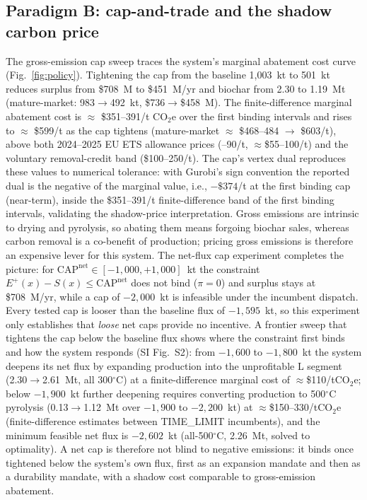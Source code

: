 \subsection{Paradigm B: cap-and-trade and the shadow carbon price}

The gross-emission cap sweep traces the system's marginal abatement cost curve
(Fig.~\ref{fig:policy}). Tightening the cap from the baseline 1{,}003~kt to
501~kt reduces surplus from \$708~M to \$451~M/yr and biochar from 2.30 to
1.19~Mt (mature-market: 983$\rightarrow$492~kt, \$736$\rightarrow$\$458~M).
The finite-difference marginal abatement cost is
$\approx$ \$351--391/t CO$_2$e over the first binding intervals and rises to
$\approx$ \$599/t as the cap tightens (mature-market $\approx$ \$468--484
$\rightarrow$ \$603/t), above both 2024--2025 EU ETS allowance prices
(--90/t, $\approx$\$55--100/t) and the voluntary removal-credit
band (\$100--250/t).
The cap's vertex dual reproduces these values to numerical tolerance: with
Gurobi's sign
convention the reported dual is the negative of the marginal value, i.e.,
$-\$374$/t at the first binding cap (near-term), inside the
\$351--391/t finite-difference band of the first binding intervals, validating the
shadow-price interpretation. Gross emissions are
intrinsic to drying and pyrolysis, so abating them means forgoing biochar
sales, whereas carbon removal is a co-benefit of production; pricing
gross emissions is therefore an expensive lever for this system. The net-flux cap
experiment completes the picture: for $\mathrm{CAP}^{\mathrm{net}}\in[-1{,}000, +1{,}000]$~kt the
constraint $E^{+}(x)-S(x)\le\mathrm{CAP}^{\mathrm{net}}$
does not bind ($\pi=0$) and surplus stays at \$708~M/yr, while a cap of
$-2{,}000$~kt is infeasible under the incumbent dispatch. Every tested cap is
looser than the baseline flux of $-1{,}595$~kt, so this experiment only
establishes that \emph{loose} net caps provide no incentive. A frontier sweep
that tightens the cap below the baseline flux shows where the constraint first
binds and how the system responds (SI Fig.~S2): from $-1{,}600$ to
$-1{,}800$~kt the system deepens its net flux by expanding production into the
unprofitable L segment (2.30$\rightarrow$2.61~Mt, all 300$^\circ$C) at a
finite-difference marginal cost of $\approx$\$110/tCO$_2$e; below
$-1{,}900$~kt further deepening requires converting production to 500$^\circ$C
pyrolysis (0.13$\rightarrow$1.12~Mt over $-1{,}900$ to $-2{,}200$~kt) at
$\approx$\$150--330/tCO$_2$e (finite-difference estimates between
TIME\_LIMIT incumbents), and the minimum feasible net flux is
$-2{,}602$~kt (all-500$^\circ$C, 2.26~Mt, solved to optimality). A net cap is
therefore not blind to negative emissions: it binds once tightened below the
system's own flux, first as an expansion mandate and then as a durability
mandate, with a shadow cost comparable to gross-emission abatement.

